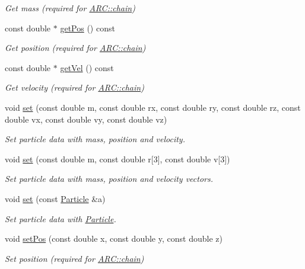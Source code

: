 \begin{DoxyCompactItemize}
\begin{DoxyCompactList}\small\item\em Get mass (required for \hyperlink{classARC_1_1chain}{A\+R\+C\+::chain}) \end{DoxyCompactList}\item 
const double $\ast$ \hyperlink{classParticle_a4ec76421cddd91b1f27357fb182f6923}{get\+Pos} () const
\begin{DoxyCompactList}\small\item\em Get position (required for \hyperlink{classARC_1_1chain}{A\+R\+C\+::chain}) \end{DoxyCompactList}\item 
const double $\ast$ \hyperlink{classParticle_ab3d63df7f8c22f232b096ae33b6ea3ac}{get\+Vel} () const
\begin{DoxyCompactList}\small\item\em Get velocity (required for \hyperlink{classARC_1_1chain}{A\+R\+C\+::chain}) \end{DoxyCompactList}\item 
void \hyperlink{classParticle_a662b86df904c9a664e0e45d93b1f4715}{set} (const double m, const double rx, const double ry, const double rz, const double vx, const double vy, const double vz)
\begin{DoxyCompactList}\small\item\em Set particle data with mass, position and velocity. \end{DoxyCompactList}\item 
void \hyperlink{classParticle_a840d9f228177200f22ef062e4cc24851}{set} (const double m, const double r\mbox{[}3\mbox{]}, const double v\mbox{[}3\mbox{]})
\begin{DoxyCompactList}\small\item\em Set particle data with mass, position and velocity vectors. \end{DoxyCompactList}\item 
void \hyperlink{classParticle_a77b1b13894b46abed113c461270ed927}{set} (const \hyperlink{classParticle}{Particle} \&a)
\begin{DoxyCompactList}\small\item\em Set particle data with \hyperlink{classParticle}{Particle}. \end{DoxyCompactList}\item 
void \hyperlink{classParticle_a97d76b66aed57834c105b78b10643b81}{set\+Pos} (const double x, const double y, const double z)
\begin{DoxyCompactList}\small\item\em Set position (required for \hyperlink{classARC_1_1chain}{A\+R\+C\+::chain}) \end{DoxyCompactList}\item 

\end{DoxyCompactItemize}
